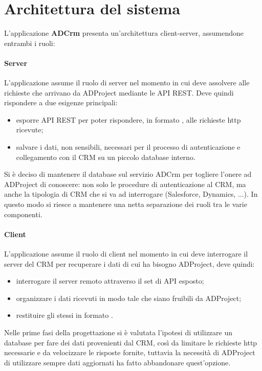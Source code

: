 \section{Architettura del sistema}
L'applicazione \textbf{ADCrm} presenta un'architettura client-server, assumendone entrambi i ruoli:
\paragraph{Server}
L'applicazione assume il ruolo di server nel momento in cui deve assolvere alle richieste che arrivano da ADProject mediante le API REST. Deve quindi rispondere a due esigenze principali:
\begin{itemize}
	\item esporre API REST per poter rispondere, in formato , alle richieste http ricevute;
	\item salvare i dati, non sensibili, necessari per il processo di autenticazione e collegamento con il CRM su un piccolo database interno.
\end{itemize} 

Si è deciso di mantenere il database sul servizio ADCrm per togliere l'onere ad ADProject di conoscere: non solo le procedure di autenticazione al CRM, ma anche la tipologia di CRM che si va ad interrogare (Salesforce, Dynamics, ...). In questo modo si riesce a mantenere una netta separazione dei ruoli tra le varie componenti. 

\paragraph{Client}
L'applicazione assume il ruolo di client nel momento in cui deve interrogare il server del CRM per recuperare i dati di cui ha bisogno ADProject, deve quindi:
\begin{itemize}
	\item interrogare il server remoto attraverso il set di API esposto;
	\item organizzare i dati ricevuti in modo tale che siano fruibili da ADProject;
	\item restituire gli stessi in formato .
\end{itemize}

Nelle prime fasi della progettazione si è valutata l'ipotesi di utilizzare un database per fare  dei dati provenienti dal CRM, così da limitare le richieste http necessarie e da velocizzare le risposte fornite, tuttavia la necessità di ADProject di utilizzare sempre dati aggiornati ha fatto abbandonare quest'opzione.\\

